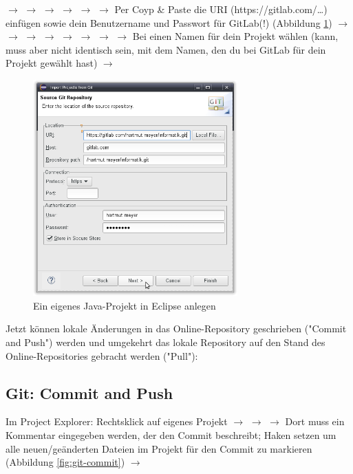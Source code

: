  $\rightarrow$  $\rightarrow$ 
$\rightarrow$  $\rightarrow$  $\rightarrow$
 $\rightarrow$  Per Coyp \& Paste die URI
(https://gitlab.com/\ldots) einfügen sowie dein Benutzername und Passwort für
GitLab(!) (Abbildung \ref{fig:import-project-from-git}) $\rightarrow$
 $\rightarrow$  $\rightarrow$  $\rightarrow$
 $\rightarrow$  $\rightarrow$ 
$\rightarrow$   $\rightarrow$ Bei  einen Namen
für dein Projekt wählen (kann, muss aber nicht identisch sein, mit dem Namen,
den du bei GitLab für dein Projekt gewählt hast)  $\rightarrow$

\begin{figure}[h]
  \centering
   \includegraphics[width=0.70\textwidth]{./inf/SEKII/01_Vorbereitung/Import_Project_from_Git.png}
   \caption{Ein eigenes Java-Projekt in Eclipse anlegen}
   \label{fig:import-project-from-git}
\end{figure}


Jetzt können lokale Änderungen in das Online-Repository geschrieben ("Commit
and Push") werden und umgekehrt das lokale Repository auf den Stand des
Online-Repositories gebracht werden ("Pull"):

\subsection{Git: Commit and Push}

Im Project Explorer: Rechtsklick auf eigenes Projekt $\rightarrow$ 
$\rightarrow$  $\rightarrow$ Dort muss ein Kommentar
eingegeben werden, der den Commit beschreibt; Haken setzen um alle
neuen/geänderten Dateien im Projekt für den Commit zu markieren (Abbildung
\ref{fig:git-commit}) $\rightarrow$ 

